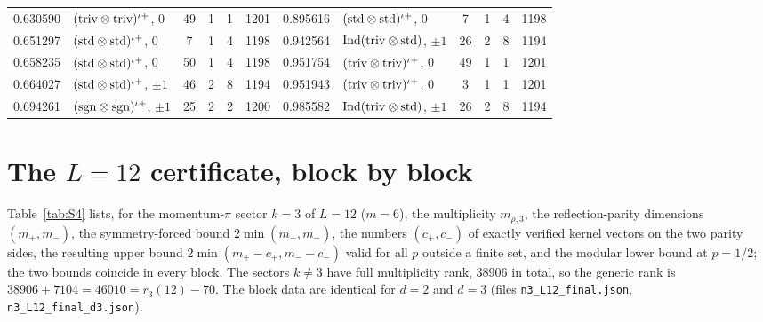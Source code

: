 \documentclass[aps,prx,reprint,superscriptaddress,nobibnotes,longbibliography]{revtex4-2}
\begin{document}
\begin{table}[t]
\begin{ruledtabular}
\begin{tabular}{llcccc|llcccc}
0.630590 & $({\rm triv}\otimes{\rm triv})^{\iota+}$, $0$ & 49 & 1 & 1 & 1201 & 0.895616 & $({\rm std}\otimes{\rm std})^{\iota+}$, $0$ & 7 & 1 & 4 & 1198\\
0.651297 & $({\rm std}\otimes{\rm std})^{\iota+}$, $0$ & 7 & 1 & 4 & 1198 & 0.942564 & ${\rm Ind}({\rm triv}\otimes{\rm std})$, $\pm1$ & 26 & 2 & 8 & 1194\\
0.658235 & $({\rm std}\otimes{\rm std})^{\iota+}$, $0$ & 50 & 1 & 4 & 1198 & 0.951754 & $({\rm triv}\otimes{\rm triv})^{\iota+}$, $0$ & 49 & 1 & 1 & 1201\\
0.664027 & $({\rm std}\otimes{\rm std})^{\iota+}$, $\pm1$ & 46 & 2 & 8 & 1194 & 0.951943 & $({\rm triv}\otimes{\rm triv})^{\iota+}$, $0$ & 3 & 1 & 1 & 1201\\
0.694261 & $({\rm sgn}\otimes{\rm sgn})^{\iota+}$, $\pm1$ & 25 & 2 & 2 & 1200 & 0.985582 & ${\rm Ind}({\rm triv}\otimes{\rm std})$, $\pm1$ & 26 & 2 & 8 & 1194\\
\end{tabular}
\end{ruledtabular}
\end{table}

\section{The $L=12$ certificate, block by block}
\label{sm:L12}

Table~\ref{tab:S4} lists, for the momentum-$\pi$ sector $k=3$ of $L=12$ ($m=6$), the multiplicity $m_{\rho,3}$, the reflection-parity dimensions $(m_+,m_-)$, the symmetry-forced bound $2\min(m_+,m_-)$, the numbers $(c_+,c_-)$ of exactly verified kernel vectors on the two parity sides, the resulting upper bound $2\min(m_+-c_+,m_--c_-)$ valid for all $p$ outside a finite set, and the modular lower bound at $p=1/2$; the two bounds coincide in every block.  The sectors $k\ne3$ have full multiplicity rank, $38906$ in total, so the generic rank is $38906+7104=46010=r_3(12)-70$.  The block data are identical for $d=2$ and $d=3$ (files \texttt{n3\_L12\_final.json}, \texttt{n3\_L12\_final\_d3.json}).
\end{document}
